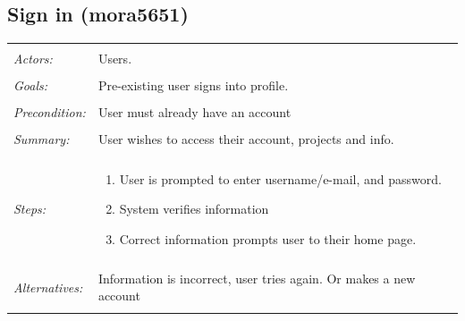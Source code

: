 \documentclass[11pt]{report}
\begin{document}
\subsection{Sign in (mora5651)}
\begin{tabular}{ p{2cm} p{12cm} }
 \hline
 \\
 \textit{Actors:} & Users. \\ 
 \\
 \textit{Goals:} & Pre-existing user signs into profile. \\
 \\
\textit{Precondition:} & User must already have an account \\
\\
\textit{Summary:} & User wishes to access their account, projects and info. \\
\\
 \textit{Steps:} & \begin{enumerate}
  \item User is prompted to enter username/e-mail, and password. 
  \item System verifies information
  \item Correct information prompts user to their home page. 
 \end{enumerate} \\
 \\
 \textit{Alternatives:} & Information is incorrect, user tries again. Or makes a new account \\
 \\
\hline
\end{tabular}
\end{document}

